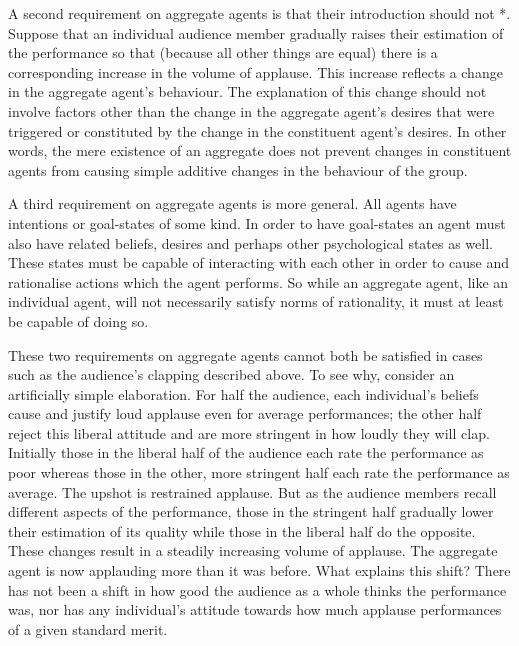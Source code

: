 \documentclass[12pt,a4paper]{extarticle}
\begin{document}
A second requirement on aggregate agents is that their introduction should not *.  Suppose that an individual audience member gradually raises their estimation of the performance so that (because all other things are equal) there is a corresponding increase in the volume of applause.  This increase reflects a change in the aggregate agent's behaviour.  The explanation of this change should not involve factors other than the change in the aggregate agent's desires that were triggered or constituted by the change in the constituent agent's desires.  In other words, the mere existence of an aggregate does not prevent changes in constituent agents from causing simple additive changes in the behaviour of the group.

A third requirement on aggregate agents is more general.  All agents have intentions or goal-states of some kind.  In order to have goal-states an agent must also have related beliefs, desires and perhaps other psychological states as well.  These states must be capable of interacting with each other in order to cause and rationalise actions which the agent performs.  So while an aggregate agent, like an individual agent, will not necessarily satisfy norms of rationality, it must at least be capable of doing so. 

These two requirements on aggregate agents cannot both be satisfied in cases such as the audience's clapping described above.  To see why, consider an artificially simple elaboration.  
For half the audience, each individual's beliefs cause and justify loud applause even for average performances; the other half reject this liberal attitude and are more stringent in how loudly they will clap.  
Initially those in the liberal half of the audience each rate the performance as poor whereas those in the other, more stringent half each rate the performance as average.  
The upshot is restrained applause.  
But as the audience members recall different aspects of the performance, those in the stringent half gradually lower their estimation of its quality while those in the liberal half do the opposite.  
These changes result in a steadily increasing volume of applause.  The aggregate agent is now applauding more than it was before.  What explains this shift?  
There has not been a shift in how good the audience as a whole thinks the performance was, nor has any individual's attitude towards how much applause performances of a given standard merit.


\end{document}
